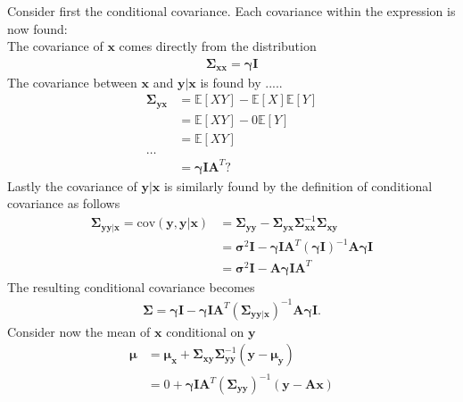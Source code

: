 Consider first the conditional covariance. Each covariance within the expression is now found:
\\
The covariance of $\textbf{x}$ comes directly from the distribution  
\begin{align*}
\boldsymbol{\Sigma}_{\textbf{xx}} = \boldsymbol{\gamma}\textbf{I}
\end{align*} 
The covariance between $\textbf{x}$ and $\textbf{y}\vert\textbf{x}$ is found by .....
\begin{align*}
\boldsymbol{\Sigma}_{\textbf{yx}} &= \mathbb{E}[XY] - \mathbb{E}[X]\mathbb{E}[Y]\\
&= \mathbb{E}[XY] - 0 \mathbb{E}[Y] \\
&= \mathbb{E}[XY]\\
\hdots \\
&= \boldsymbol{\gamma}\textbf{I}\textbf{A}^T?
\end{align*}
Lastly the covariance of $\textbf{y}\vert \textbf{x}$ is similarly found by the definition of conditional covariance as follows 
\begin{align*}
\boldsymbol{\Sigma}_{\textbf{yy} \vert \mathbf{x}} =  \text{cov}(\textbf{y},\textbf{y}\vert \textbf{x}) &= \boldsymbol{\Sigma}_{\textbf{yy}} - \boldsymbol{\Sigma}_{\textbf{yx}}\boldsymbol{\Sigma}_{\textbf{xx}}^{-1}\boldsymbol{\Sigma}_{\textbf{xy}} \\
&= \boldsymbol{\sigma}^2 \textbf{I} - \boldsymbol{\gamma}\textbf{I}\textbf{A}^T (\boldsymbol{\gamma}\textbf{I})^{-1} \textbf{A}\boldsymbol{\gamma}\textbf{I} \\
&= \boldsymbol{\sigma}^2 \textbf{I} - \textbf{A}\boldsymbol{\gamma}\textbf{I}\textbf{A}^T
\end{align*} 
The resulting conditional covariance becomes 
\begin{align*}
\boldsymbol{\Sigma} = \boldsymbol{\gamma}\textbf{I} - \boldsymbol{\gamma}\textbf{I}\textbf{A}^T (\boldsymbol{\Sigma}_{\textbf{yy}\vert \textbf{x}})^{-1} \textbf{A} \boldsymbol{\gamma}\textbf{I}.
\end{align*}
Consider now the mean of $\textbf{x}$ conditional on $\textbf{y}$
\begin{align*}
\boldsymbol{\mu} &= \boldsymbol{\mu}_{\textbf{x}}+\boldsymbol{\Sigma}_{\textbf{xy}}\boldsymbol{\Sigma}_{\textbf{yy}}^{-1}\left( \textbf{y}-\boldsymbol{\mu}_{\textbf{y}}\right) \\
&= 0 + \boldsymbol{\gamma}\textbf{I}\textbf{A}^T \left( \boldsymbol{\Sigma}_{\textbf{yy}}\right)^{-1}\left(\textbf{y}-\textbf{Ax}\right)
\end{align*}  
